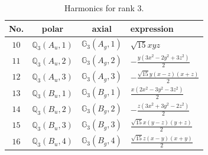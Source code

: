\documentclass[fleqn,8pt,landscape]{jsarticle}
\begin{document}
\begin{table}[ht!]
\begin{center}
\caption{Harmonics for rank 3.}
\renewcommand{\arraystretch}{1.3}
\begin{tabular}{cccl} \hline \hline
No. & polar & axial & expression \\ \hline
$ 10 $ & $ \mathbb{Q}_{3}(A_{u},1) $ & $ \mathbb{G}_{3}(A_{g},1) $ & $ \sqrt{15} x y z $ \\
$ 11 $ & $ \mathbb{Q}_{3}(A_{u},2) $ & $ \mathbb{G}_{3}(A_{g},2) $ & $ - \frac{y \left(3 x^{2} - 2 y^{2} + 3 z^{2}\right)}{2} $ \\
$ 12 $ & $ \mathbb{Q}_{3}(A_{u},3) $ & $ \mathbb{G}_{3}(A_{g},3) $ & $ - \frac{\sqrt{15} y \left(x - z\right) \left(x + z\right)}{2} $ \\
$ 13 $ & $ \mathbb{Q}_{3}(B_{u},1) $ & $ \mathbb{G}_{3}(B_{g},1) $ & $ \frac{x \left(2 x^{2} - 3 y^{2} - 3 z^{2}\right)}{2} $ \\
$ 14 $ & $ \mathbb{Q}_{3}(B_{u},2) $ & $ \mathbb{G}_{3}(B_{g},2) $ & $ - \frac{z \left(3 x^{2} + 3 y^{2} - 2 z^{2}\right)}{2} $ \\
$ 15 $ & $ \mathbb{Q}_{3}(B_{u},3) $ & $ \mathbb{G}_{3}(B_{g},3) $ & $ \frac{\sqrt{15} x \left(y - z\right) \left(y + z\right)}{2} $ \\
$ 16 $ & $ \mathbb{Q}_{3}(B_{u},4) $ & $ \mathbb{G}_{3}(B_{g},4) $ & $ \frac{\sqrt{15} z \left(x - y\right) \left(x + y\right)}{2} $ \\
 \hline \hline
\end{tabular}
\end{center}
\end{table}
\end{document}
